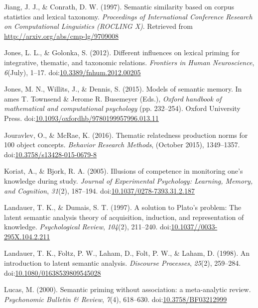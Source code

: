 \documentclass[english,,man]{apa6}
\begin{document}
\hypertarget{ref-Jiang1997}{}
Jiang, J. J., \& Conrath, D. W. (1997). Semantic similarity based on
corpus statistics and lexical taxonomy. \emph{Proceedings of
International Conference Research on Computational Linguistics (ROCLING
X)}. Retrieved from \url{http://arxiv.org/abs/cmp-lg/9709008}

\hypertarget{ref-Jones2012}{}
Jones, L. L., \& Golonka, S. (2012). Different influences on lexical
priming for integrative, thematic, and taxonomic relations.
\emph{Frontiers in Human Neuroscience}, \emph{6}(July), 1--17.
doi:\href{https://doi.org/10.3389/fnhum.2012.00205}{10.3389/fnhum.2012.00205}

\hypertarget{ref-Jones2015}{}
Jones, M. N., Willits, J., \& Dennis, S. (2015). Models of semantic
memory. In ames T. Townsend \& Jerome R. Busemeyer (Eds.), \emph{Oxford
handbook of mathematical and computational psychology} (pp. 232--254).
Oxford University Press.
doi:\href{https://doi.org/10.1093/oxfordhb/9780199957996.013.11}{10.1093/oxfordhb/9780199957996.013.11}

\hypertarget{ref-Jouravlev2016}{}
Jouravlev, O., \& McRae, K. (2016). Thematic relatedness production
norms for 100 object concepts. \emph{Behavior Research Methods},
(October 2015), 1349--1357.
doi:\href{https://doi.org/10.3758/s13428-015-0679-8}{10.3758/s13428-015-0679-8}

\hypertarget{ref-Koriat2005}{}
Koriat, A., \& Bjork, R. A. (2005). Illusions of competence in
monitoring one's knowledge during study. \emph{Journal of Experimental
Psychology: Learning, Memory, and Cognition}, \emph{31}(2), 187--194.
doi:\href{https://doi.org/10.1037/0278-7393.31.2.187}{10.1037/0278-7393.31.2.187}

\hypertarget{ref-Landauer1997}{}
Landauer, T. K., \& Dumais, S. T. (1997). A solution to Plato's problem:
The latent semantic analysis theory of acquisition, induction, and
representation of knowledge. \emph{Psychological Review}, \emph{104}(2),
211--240.
doi:\href{https://doi.org/10.1037//0033-295X.104.2.211}{10.1037//0033-295X.104.2.211}

\hypertarget{ref-Landauer1998}{}
Landauer, T. K., Foltz, P. W., Laham, D., Folt, P. W., \& Laham, D.
(1998). An introduction to latent semantic analysis. \emph{Discourse
Processes}, \emph{25}(2), 259--284.
doi:\href{https://doi.org/10.1080/01638539809545028}{10.1080/01638539809545028}

\hypertarget{ref-Lucas2000}{}
Lucas, M. (2000). Semantic priming without association: a meta-analytic
review. \emph{Psychonomic Bulletin \& Review}, \emph{7}(4), 618--630.
doi:\href{https://doi.org/10.3758/BF03212999}{10.3758/BF03212999}
\end{document}
